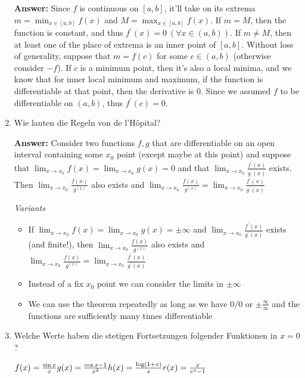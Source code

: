 \documentclass[11pt]{article}
\begin{document}
\begin{enumerate}
    \textbf{Answer:} Since $f$ is continuous on $[a, b]$, it'll take on its extrema $m = \min_{x \in [a, b]}{f(x)}$ and $M = \max_{x \in [a, b]}{f(x)}$. If $m = M$, then the function is constant, and thus $f^\prime(x) = 0~(\forall x\in(a, b))$. If $m \neq M$, then at least one of the place of extrema is an inner point of $[a, b]$. Without loss of generality, suppose that $m = f(c)$ for some $c \in (a, b)$ (otherwise consider $-f$). If $c$ is a minimum point, then it's also a local minima, and we know that for inner local minimum and maximum, if the function is differentiable at that point, then the derivative is $0$. Since we assumed $f$ to be differentiable on $(a, b)$, thus $f^\prime(c) = 0$.

    \item Wie lauten die Regeln von de l'Hôpital?
    
    \textbf{Answer:} Consider two functions $f, g$ that are differentiable on an open interval containing some $x_0$ point (except maybe at this point) and suppose that $\lim_{x \to x_0}f(x) = \lim_{x \to x_0} g(x) = 0$ and that $\lim_{x \to x_0}\frac{f^\prime(x)}{g^\prime(x)}$ exists. Then $\lim_{x \to x_0}\frac{f(x)}{g^(x)}$ also exists and $\lim_{x \to x_0}\frac{f(x)}{g^(x)} = \lim_{x \to x_0}\frac{f^\prime(x)}{g^\prime(x)}$

    \textit{Variants}
    \begin{itemize}
        \item If $\lim_{x \to x_0}f(x) = \lim_{x \to x_0} g(x) = \pm \infty$ and $\lim_{x \to x_0}\frac{f^\prime(x)}{g^\prime(x)}$ exists (and finite!), then $\lim_{x \to x_0}\frac{f(x)}{g^(x)}$ also exists and $\lim_{x \to x_0}\frac{f(x)}{g^(x)} = \lim_{x \to x_0}\frac{f^\prime(x)}{g^\prime(x)}$
        \item Instead of a fix $x_0$ point we can consider the limits in $\pm \infty$
        \item We can use the theorem repeatedly as long as we have $0/0$ or $\pm\frac{\infty}{\infty}$ and the functions are sufficiently many times differentiable
    \end{itemize}

    \item Welche Werte haben die stetigen Fortsetzungen folgender Funktionen in $x = 0$?
    
    \hspace*{\fill}
    $f(x) = \frac{\sin{x}}{x} \hfill g(x) = \frac{\cos{x} - 1}{x^2} \hfill h(x) = \frac{\log(1+x)}{x} \hfill r(x) = \frac{x}{e^x -1}$
    \hspace*{\fill}


\end{enumerate}
\end{document}
